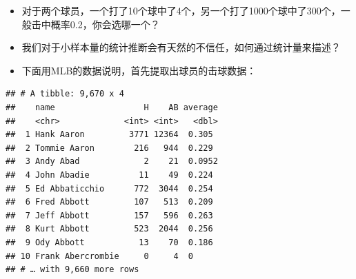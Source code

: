 \documentclass[]{book}
\newenvironment{Shaded}{\begin{snugshade}}{\end{snugshade}}
\newcommand{\CommentTok}[1]{\textcolor[rgb]{0.56,0.35,0.01}{\textit{#1}}}
\newcommand{\DataTypeTok}[1]{\textcolor[rgb]{0.13,0.29,0.53}{#1}}
\newcommand{\DecValTok}[1]{\textcolor[rgb]{0.00,0.00,0.81}{#1}}
\newcommand{\KeywordTok}[1]{\textcolor[rgb]{0.13,0.29,0.53}{\textbf{#1}}}
\newcommand{\NormalTok}[1]{#1}
\newcommand{\OperatorTok}[1]{\textcolor[rgb]{0.81,0.36,0.00}{\textbf{#1}}}
\newcommand{\StringTok}[1]{\textcolor[rgb]{0.31,0.60,0.02}{#1}}
\begin{document}
\begin{itemize}
\item
  对于两个球员，一个打了10个球中了4个，另一个打了1000个球中了300个，一般击中概率0.2，你会选哪一个？
\item
  我们对于小样本量的统计推断会有天然的不信任，如何通过统计量来描述？
\item
  下面用MLB的数据说明，首先提取出球员的击球数据：
\end{itemize}

\begin{Shaded}
\end{Shaded}

\begin{verbatim}
## # A tibble: 9,670 x 4
##    name                  H    AB average
##    <chr>             <int> <int>   <dbl>
##  1 Hank Aaron         3771 12364  0.305 
##  2 Tommie Aaron        216   944  0.229 
##  3 Andy Abad             2    21  0.0952
##  4 John Abadie          11    49  0.224 
##  5 Ed Abbaticchio      772  3044  0.254 
##  6 Fred Abbott         107   513  0.209 
##  7 Jeff Abbott         157   596  0.263 
##  8 Kurt Abbott         523  2044  0.256 
##  9 Ody Abbott           13    70  0.186 
## 10 Frank Abercrombie     0     4  0     
## # … with 9,660 more rows
\end{verbatim}
\end{document}
